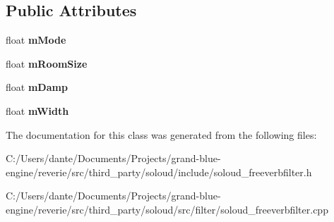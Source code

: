 \subsection*{Public Attributes}
\begin{DoxyCompactItemize}
\item 
\mbox{\label{class_so_loud_1_1_freeverb_filter_ac4880033d4f5b2128473dc95f96851ec}} 
float {\bfseries m\+Mode}
\item 
\mbox{\label{class_so_loud_1_1_freeverb_filter_ab48c0480a2fc5603bdd1f85e4f000935}} 
float {\bfseries m\+Room\+Size}
\item 
\mbox{\label{class_so_loud_1_1_freeverb_filter_a0f366463543718a2e8a1f2892f46f3e1}} 
float {\bfseries m\+Damp}
\item 
\mbox{\label{class_so_loud_1_1_freeverb_filter_a0cd4f1968eb01d333689d399f7d6c231}} 
float {\bfseries m\+Width}
\end{DoxyCompactItemize}


The documentation for this class was generated from the following files\+:\begin{DoxyCompactItemize}
\item 
C\+:/\+Users/dante/\+Documents/\+Projects/grand-\/blue-\/engine/reverie/src/third\+\_\+party/soloud/include/soloud\+\_\+freeverbfilter.\+h\item 
C\+:/\+Users/dante/\+Documents/\+Projects/grand-\/blue-\/engine/reverie/src/third\+\_\+party/soloud/src/filter/soloud\+\_\+freeverbfilter.\+cpp\end{DoxyCompactItemize}

